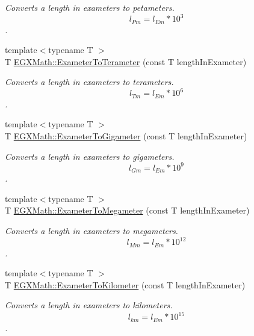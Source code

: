 \begin{DoxyCompactItemize}
\begin{DoxyCompactList}\small\item\em Converts a length in exameters to petameters. \[ l_{Pm}=l_{Em} * 10^{3} \]. \end{DoxyCompactList}\item 
{\footnotesize template$<$typename T $>$ }\\T \mbox{\hyperlink{group___e_g_x_math-_conversions-_length_conversions-_s_i-_exameter-_s_i_gaf16e87fbeccc6175baa72ed6bb9db027}{E\+G\+X\+Math\+::\+Exameter\+To\+Terameter}} (const T length\+In\+Exameter)
\begin{DoxyCompactList}\small\item\em Converts a length in exameters to terameters. \[ l_{Tm}=l_{Em} * 10^{6} \]. \end{DoxyCompactList}\item 
{\footnotesize template$<$typename T $>$ }\\T \mbox{\hyperlink{group___e_g_x_math-_conversions-_length_conversions-_s_i-_exameter-_s_i_gae0a019ba27e962c891f014ae4748fd14}{E\+G\+X\+Math\+::\+Exameter\+To\+Gigameter}} (const T length\+In\+Exameter)
\begin{DoxyCompactList}\small\item\em Converts a length in exameters to gigameters. \[ l_{Gm}=l_{Em} * 10^{9} \]. \end{DoxyCompactList}\item 
{\footnotesize template$<$typename T $>$ }\\T \mbox{\hyperlink{group___e_g_x_math-_conversions-_length_conversions-_s_i-_exameter-_s_i_gac3451985da098b2668e48c30468efd83}{E\+G\+X\+Math\+::\+Exameter\+To\+Megameter}} (const T length\+In\+Exameter)
\begin{DoxyCompactList}\small\item\em Converts a length in exameters to megameters. \[ l_{Mm}=l_{Em} * 10^{12} \]. \end{DoxyCompactList}\item 
{\footnotesize template$<$typename T $>$ }\\T \mbox{\hyperlink{group___e_g_x_math-_conversions-_length_conversions-_s_i-_exameter-_s_i_gad8c1732c3b4a07b330d5327c099bbd7c}{E\+G\+X\+Math\+::\+Exameter\+To\+Kilometer}} (const T length\+In\+Exameter)
\begin{DoxyCompactList}\small\item\em Converts a length in exameters to kilometers. \[ l_{km}=l_{Em} * 10^{15} \]. \end{DoxyCompactList}\item 

\end{DoxyCompactItemize}
